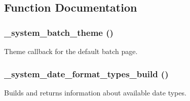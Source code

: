 \subsection{Function Documentation}
\hypertarget{system_8module_a2d3a1205255a83b5f5c3c720a758f837}{
\subsubsection[{\_\-system\_\-batch\_\-theme}]{\setlength{\rightskip}{0pt plus 5cm}\_\-system\_\-batch\_\-theme ()}}
\label{system_8module_a2d3a1205255a83b5f5c3c720a758f837}
Theme callback for the default batch page. \hypertarget{system_8module_aed8872b51fe912cbf8d4e966af237b66}{
\subsubsection[{\_\-system\_\-date\_\-format\_\-types\_\-build}]{\setlength{\rightskip}{0pt plus 5cm}\_\-system\_\-date\_\-format\_\-types\_\-build ()}}
\label{system_8module_aed8872b51fe912cbf8d4e966af237b66}
Builds and returns information about available date types.

